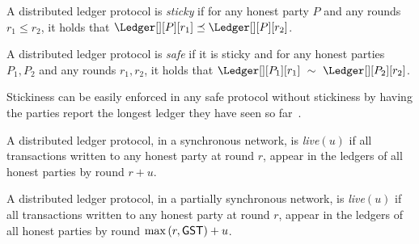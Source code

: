 \begin{definition}[Stickiness]
  A distributed ledger protocol is \emph{sticky} if
  for any honest party $P$ and any rounds $r_1 \leq r_2$,
  it holds that $\Ledger[][P][r_1] \preceq \Ledger[][P][r_2]$.
\end{definition}

\begin{definition}[Safety]
  A distributed ledger protocol is \emph{safe} if it is sticky and
  for any honest parties $P_1, P_2$ and any rounds $r_1, r_2$, it holds that
  $\Ledger[][P_1][r_1]~\sim~\Ledger[][P_2][r_2]$. 
\end{definition}

Stickiness can be easily enforced in any safe protocol
without stickiness by having the parties report the longest
ledger they have seen so far~\cite{streamlet}.

\begin{definition}
  A distributed ledger protocol, in a synchronous network, is \emph{live}$(u)$ if
  all transactions written to any honest party
  at round $r$, appear in the ledgers of all honest parties by round
  $r + u$.
\end{definition}

\begin{definition}
  A distributed ledger protocol, in a partially synchronous network,
  is \emph{live}$(u)$ if all transactions written to any honest party
  at round $r$, appear in the ledgers of all honest parties by round
  $\max{(r,\textsf{GST})} + u$.
\end{definition}

